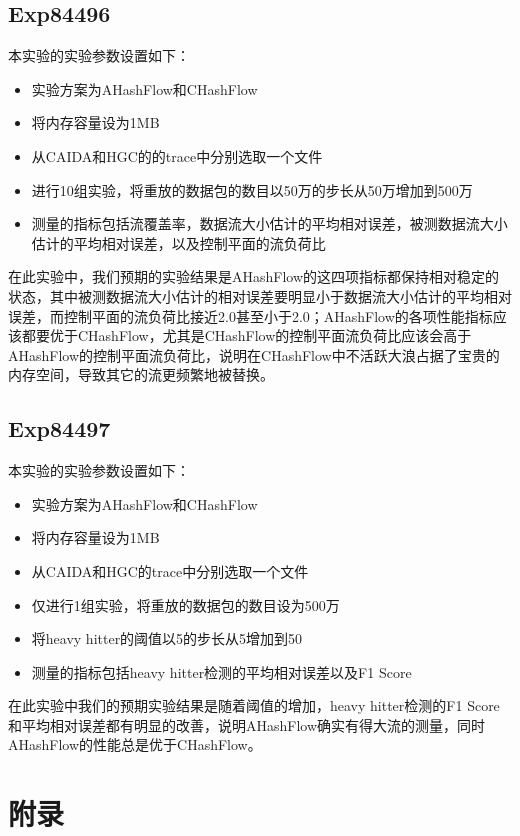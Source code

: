 \documentclass{article}
\begin{document}
\subsection{Exp84496}
本实验的实验参数设置如下：
\begin{itemize}
\item 实验方案为AHashFlow和CHashFlow
\item 将内存容量设为1MB
\item 从CAIDA和HGC的的trace中分别选取一个文件
\item 进行10组实验，将重放的数据包的数目以50万的步长从50万增加到500万
\item 测量的指标包括流覆盖率，数据流大小估计的平均相对误差，被测数据流大小估计的平均相对误差，以及控制平面的流负荷比
\end{itemize}

在此实验中，我们预期的实验结果是AHashFlow的这四项指标都保持相对稳定的状态，其中被测数据流大小估计的相对误差要明显小于数据流大小估计的平均相对误差，而控制平面的流负荷比接近2.0甚至小于2.0；AHashFlow的各项性能指标应该都要优于CHashFlow，尤其是CHashFlow的控制平面流负荷比应该会高于AHashFlow的控制平面流负荷比，说明在CHashFlow中不活跃大浪占据了宝贵的内存空间，导致其它的流更频繁地被替换。

\subsection{Exp84497}
本实验的实验参数设置如下：
\begin{itemize}
\item 实验方案为AHashFlow和CHashFlow
\item 将内存容量设为1MB
\item 从CAIDA和HGC的trace中分别选取一个文件
\item 仅进行1组实验，将重放的数据包的数目设为500万
\item 将heavy hitter的阈值以5的步长从5增加到50
\item 测量的指标包括heavy hitter检测的平均相对误差以及F1 Score
\end{itemize}

在此实验中我们的预期实验结果是随着阈值的增加，heavy hitter检测的F1 Score和平均相对误差都有明显的改善，说明AHashFlow确实有得大流的测量，同时AHashFlow的性能总是优于CHashFlow。

\appendix
\section*{附录}
\end{document}
